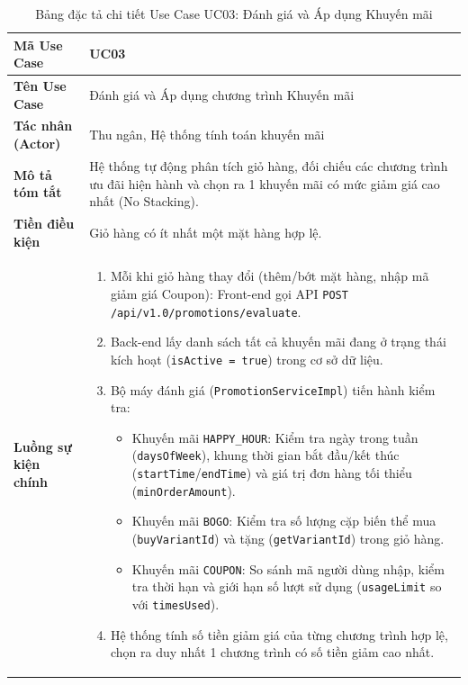 \begin{table}[htbp]
\centering
\caption{Bảng đặc tả chi tiết Use Case UC03: Đánh giá và Áp dụng Khuyến mãi}
\label{tab:uc03_promotion}
\vspace{2mm}
\begin{tabularx}{\textwidth}{|l|X|}
\hline
\textbf{Mã Use Case} & \textbf{UC03} \\ \hline
\textbf{Tên Use Case} & Đánh giá và Áp dụng chương trình Khuyến mãi \\ \hline
\textbf{Tác nhân (Actor)} & Thu ngân, Hệ thống tính toán khuyến mãi \\ \hline
\textbf{Mô tả tóm tắt} & Hệ thống tự động phân tích giỏ hàng, đối chiếu các chương trình ưu đãi hiện hành và chọn ra 1 khuyến mãi có mức giảm giá cao nhất (No Stacking). \\ \hline
\textbf{Tiền điều kiện} & Giỏ hàng có ít nhất một mặt hàng hợp lệ. \\ \hline
\textbf{Luồng sự kiện chính} & 
\begin{enumerate}[leftmargin=*, nosep]
    \item Mỗi khi giỏ hàng thay đổi (thêm/bớt mặt hàng, nhập mã giảm giá Coupon): Front-end gọi API \texttt{POST /api/v1.0/promotions/evaluate}.
    \item Back-end lấy danh sách tất cả khuyến mãi đang ở trạng thái kích hoạt (\texttt{isActive = true}) trong cơ sở dữ liệu.
    \item Bộ máy đánh giá (\texttt{PromotionServiceImpl}) tiến hành kiểm tra:
    \begin{itemize}
        \item Khuyến mãi \texttt{HAPPY\_HOUR}: Kiểm tra ngày trong tuần (\texttt{daysOfWeek}), khung thời gian bắt đầu/kết thúc (\texttt{startTime}/\texttt{endTime}) và giá trị đơn hàng tối thiểu (\texttt{minOrderAmount}).
        \item Khuyến mãi \texttt{BOGO}: Kiểm tra số lượng cặp biến thể mua (\texttt{buyVariantId}) và tặng (\texttt{getVariantId}) trong giỏ hàng.
        \item Khuyến mãi \texttt{COUPON}: So sánh mã người dùng nhập, kiểm tra thời hạn và giới hạn số lượt sử dụng (\texttt{usageLimit} so với \texttt{timesUsed}).
    \end{itemize}
    \item Hệ thống tính số tiền giảm giá của từng chương trình hợp lệ, chọn ra duy nhất 1 chương trình có số tiền giảm cao nhất.

\end{enumerate}
\end{tabularx}
\end{table}
